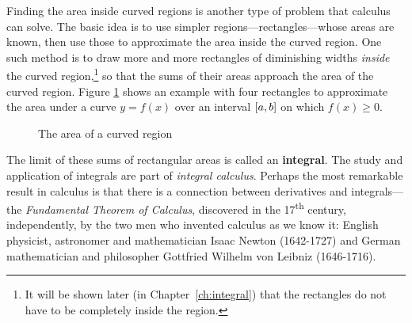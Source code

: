 Finding the area inside curved regions is another type of problem that calculus
can solve. The basic idea is to use simpler regions---rectangles---whose areas
are known, then use those to approximate the area inside the curved
region. One such method is to draw more and more rectangles of diminishing
widths \emph{inside} the curved region,\footnote{It will be
shown later (in Chapter~\ref{ch:integral}) that the rectangles do not have to be completely
inside the region.} so that the sums of their areas approach the area of the
curved region. Figure \ref{fig:area} shows an example with four
rectangles to approximate the area under a curve $y=f(x)$ over an interval
$\lbrack a,b \rbrack$ on which $f(x) \ge 0$.

\begin{figure}[ht]
 \begin{center}
  \vspace{-6mm}
 \end{center}
 \caption[]{\quad The area of a curved region}
 \label{fig:area}
\end{figure}

The limit of these sums of rectangular areas is called an \textbf{integral}.
The study and application of integrals are part of
\emph{integral calculus}. Perhaps the most remarkable result in
calculus is that there is a connection between derivatives and integrals---the
\emph{Fundamental Theorem of Calculus}, discovered
in the 17\textsuperscript{th} century, independently, by the two men who
invented calculus as we know it: English physicist, astronomer and
mathematician Isaac Newton (1642-1727) and German mathematician and philosopher
Gottfried Wilhelm von Leibniz (1646-1716).

